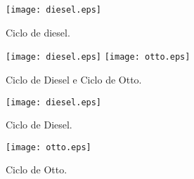 \documentclass[10pt]{article}
\begin{document}
\renewcommand{\figurename}{Figura}

\begin{figure}[!t]
\centering
\texttt{[image: diesel.eps]}
\caption{Ciclo de diesel.}
\label{ciclodediesel}
\end{figure}

\begin{figure}[!b]
\centering
\texttt{[image: diesel.eps]}%
\texttt{[image: otto.eps]}
\caption{Ciclo de Diesel e Ciclo de Otto.}
\label{ciclodedieseleotto}
\end{figure}

\begin{figure}[h]
\flushleft
\texttt{[image: diesel.eps]}
\caption{Ciclo de Diesel.}
\label{ciclodedieseleotto1}

\vspace{1.0cm}

\hspace{0.6cm}
\texttt{[image: otto.eps]}
\caption{Ciclo de Otto.}
\label{ciclodedieseleotto2}
\end{figure}
\end{document}
